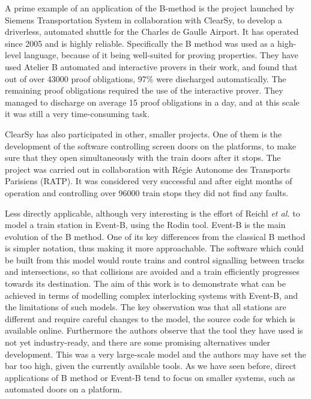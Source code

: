 \documentclass[12pt,journal,duplex]{IEEEtran}
\begin{document}
	A prime example of an application of the B-method is the project launched by Siemens Transportation System in collaboration with ClearSy, to develop a driverless, automated shuttle for the Charles de Gaulle Airport\cite{airport shuttle}. It has operated since 2005 and is highly reliable. Specifically the B method was used as a high-level language, because of it being well-suited for proving properties. They have used Atelier B automated and interactive provers in their work, and found that out of over 43000 proof obligations, 97\% were discharged automatically. The remaining proof obligations required the use of the interactive prover. They managed to discharge on average 15 proof obligations in a day, and at this scale it was still a very time-consuming task.

	ClearSy has also participated in other, smaller projects. One of them is the development of the software controlling screen doors on the platforms, to make sure that they open simultaneously with the train doors after it stops. The project was carried out in collaboration with R\'{e}gie Autonome des Transports Parisiens (RATP). It was considered very successful and after eight months of operation and controlling over 96000 train stops they did not find any faults\cite{screen doors}.

	Less directly applicable, although very interesting is the effort of Reichl \textit{et al.} to model a train station in Event-B, using the Rodin tool\cite{station model}. Event-B is the main evolution of the B method. One of its key differences from the classical B method is simpler notation, thus making it more approachable.\cite{event-b} The software which could be built from this model would route trains and control signalling between tracks and intersections, so that collisions are avoided and a train efficiently progresses towards its destination. The aim of this work is to demonstrate what can be achieved in terms of modelling complex interlocking systems with Event-B, and the limitations of such models. The key observation was that all stations are different and require careful changes to the model, the source code for which is available online. Furthermore the authors observe that the tool they have used is not yet industry-ready, and there are some promising alternatives under development. This was a very large-scale model and the authors may have set the bar too high, given the currently available tools. As we have seen before, direct applications of B method or Event-B tend to focus on smaller systems, such as automated doors on a platform.
\end{document}
